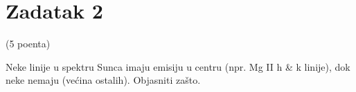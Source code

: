 \documentclass[12pt]{article}
\begin{document}
\section*{Zadatak 2}

(5 poenta)

Neke linije u spektru Sunca imaju emisiju u centru (npr. Mg II h \& k linije), dok neke nemaju (ve\'{c}ina ostalih). Objasniti za\v{s}to.
\end{document}
